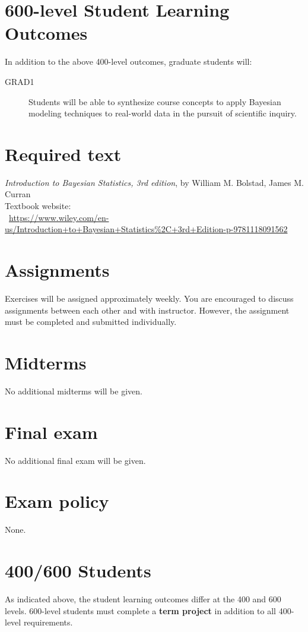 \documentclass[11pt,onecolumn]{article}
\begin{document}
\section*{600-level Student Learning Outcomes}
In addition to the above 400-level outcomes, graduate students will:
\begin{description}
\item[GRAD1] Students will be able to synthesize course concepts to apply Bayesian modeling techniques to real-world data in the pursuit of scientific inquiry.
\end{description}

\section*{Required text}
\emph{Introduction to Bayesian Statistics, 3rd edition}, by William M. Bolstad, James M. Curran\\
Textbook website:\\~\url{https://www.wiley.com/en-us/Introduction+to+Bayesian+Statistics%2C+3rd+Edition-p-9781118091562}

\section*{Assignments}
Exercises will be assigned approximately weekly. You are encouraged to discuss assignments between each other and with instructor. However, the assignment must be completed and submitted individually.

\section*{Midterms}
No additional midterms will be given.

\section*{Final exam}
No additional final exam will be given.

\section*{Exam policy}
None.

\section*{400/600 Students}
As indicated above, the student learning outcomes differ at the 400 and 600 levels. 600-level students must complete a \textbf{term project} in addition to all 400-level requirements.
\end{document}
